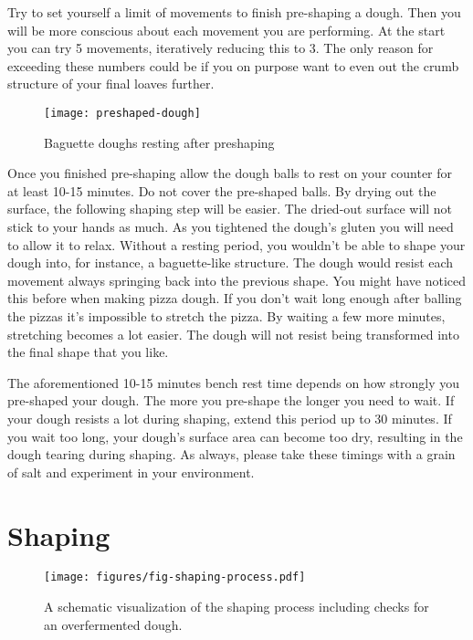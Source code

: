 Try to set yourself a limit of movements to finish pre-shaping
a dough. Then you will be more conscious about each movement
you are performing. At the start you can try 5 movements,
iteratively reducing this to 3. The only reason for exceeding these
numbers could be if you on purpose want to even out the crumb
structure of your final loaves further.

\begin{figure}[!htb]
  \texttt{[image: preshaped-dough]}
  \caption{Baguette doughs resting after preshaping}
  \label{fig:dough-after-preshaping}
\end{figure}

Once you finished pre-shaping allow the dough balls to rest
on your counter for at least 10-15 minutes. Do not
cover the pre-shaped balls. By drying out the surface,
the following shaping step will be easier. The dried-out surface
will not stick to your hands as much. As
you tightened the dough's gluten you will need to
allow it to relax. Without a resting period, you wouldn't
be able to shape your dough into, for instance, a baguette-like structure.
The dough would resist each movement
always springing back into the previous shape. You
might have noticed this before when making pizza dough. If you
don't wait long enough after balling the pizzas it's impossible
to stretch the pizza. By waiting a few more minutes,
stretching becomes a lot easier. The dough will not resist
being transformed into the final shape that you like.

The aforementioned 10-15 minutes bench rest time depends
on how strongly you pre-shaped your dough. The more
you pre-shape the longer you need to wait. If your dough
resists a lot during shaping, extend this period up to 30 minutes.
If you wait too long, your dough's surface area can become too dry,
resulting in the dough tearing during shaping. As always, please
take these timings with a grain of salt and experiment in
your environment.

\section{Shaping}

\begin{figure}[!htb]
  \texttt{[image: figures/fig-shaping-process.pdf]}
  \caption{A schematic visualization of the shaping process including checks for an overfermented dough.}
  \label{fig:shaping-decision-tree}
\end{figure}

